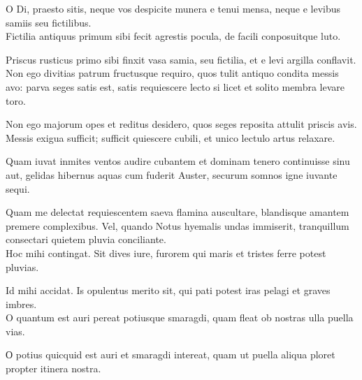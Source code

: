 \noindent O Di, praesto sitis, neque vos despicite munera e tenui mensa, neque e levibus samiis seu fictilibus.\\

{\large
\noindent Fictilia antiquus primum sibi fecit agrestis pocula, de facili conposuitque luto.\\

}

\noindent Priscus rusticus primo sibi finxit vasa samia, seu fictilia, et e levi argilla conflavit. \\

{\large
\noindent Non ego divitias patrum fructusque requiro, quos tulit antiquo condita messis avo: parva seges satis est, satis requiescere lecto si licet et solito membra levare toro.\\

}

\noindent Non ego majorum opes et reditus desidero, quos seges reposita attulit priscis avis. Messis exigua sufficit; sufficit quiescere cubili, et unico lectulo artus relaxare. \\

\newpage

{\large
\noindent Quam iuvat inmites ventos audire cubantem et dominam tenero continuisse sinu aut, gelidas hibernus aquas cum fuderit Auster, securum somnos igne iuvante sequi.\\

}

\noindent Quam me delectat requiescentem saeva flamina auscultare, blandisque amantem premere complexibus. Vel, quando Notus hyemalis undas immiserit, tranquillum consectari quietem pluvia conciliante. \\


{\large
\noindent Hoc mihi contingat. Sit dives iure, furorem qui maris et tristes ferre potest pluvias.\\

}

\noindent Id mihi accidat. Is opulentus merito sit, qui pati potest iras pelagi et graves imbres. \\

{\large
\noindent O quantum est auri pereat potiusque smaragdi, quam fleat ob nostras ulla puella vias.\\

}

\noindent О potius quicquid est auri et smaragdi intereat, quam ut puella aliqua ploret propter itinera nostra. \\

